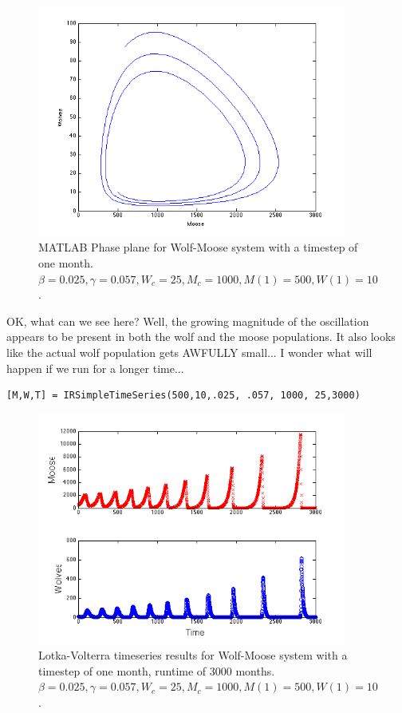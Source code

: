 \begin{figure}[h!]
\includegraphics[width=4in]{figs/WolfMooseMATLABPP}
\caption{MATLAB Phase plane for Wolf-Moose system with a timestep of one month.  $\beta = 0.025, \gamma = 0.057, W_c = 25, M_c=1000, M(1) = 500, W(1) = 10$.}
\end{figure}


OK, what can we see here?  Well, the growing magnitude of the oscillation appears to be present in both the wolf and the moose populations.  It also looks like the actual wolf population gets AWFULLY small...  I wonder what will happen if we run for a longer time...

\begin{verbatim}
[M,W,T] = IRSimpleTimeSeries(500,10,.025, .057, 1000, 25,3000)
\end{verbatim}

\begin{figure}[h!]
\includegraphics[width=4in]{figs/StackedWolfMooseTimeSeriesLongTime}
\caption{Lotka-Volterra timeseries results for Wolf-Moose system with a timestep of one month, runtime of 3000 months.  $\beta = 0.025, \gamma = 0.057, W_c = 25, M_c=1000, M(1) = 500, W(1) = 10$.}
\end{figure}

